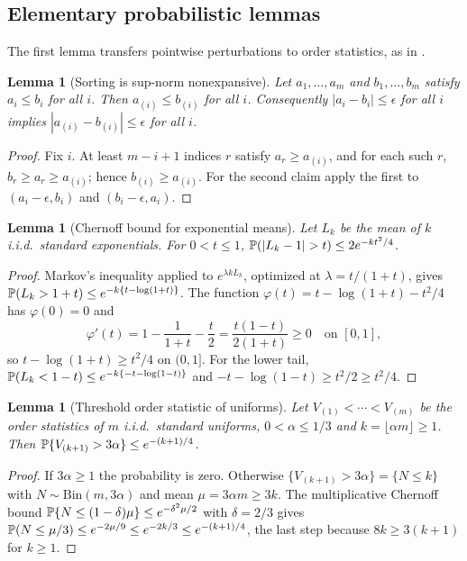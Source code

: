 \documentclass[bj,authoryear]{imsart}
\theoremstyle{plain}
\newtheorem{lemma}[theorem]{Lemma}
\begin{document}
\begin{appendix}
\subsection{Elementary probabilistic lemmas}\label{app:elementary}

The first lemma transfers pointwise perturbations to order statistics, as
in \citet[Appendix, Lemma~3]{gardesPodgorny2025}.

\begin{lemma}[Sorting is sup-norm nonexpansive]\label{lem:app-sorting}
Let $a_1,\ldots,a_m$ and $b_1,\ldots,b_m$ satisfy $a_i\le b_i$ for all $i$.
Then $a_{(i)}\le b_{(i)}$ for all $i$.  Consequently
$|a_i-b_i|\le\epsilon$ for all $i$ implies
$|a_{(i)}-b_{(i)}|\le\epsilon$ for all $i$.
\end{lemma}

\begin{proof}
Fix $i$.  At least $m-i+1$ indices $r$ satisfy $a_r\ge a_{(i)}$, and for
each such $r$, $b_r\ge a_r\ge a_{(i)}$; hence $b_{(i)}\ge a_{(i)}$.  For
the second claim apply the first to $(a_i-\epsilon,b_i)$ and
$(b_i-\epsilon,a_i)$.
\end{proof}

\begin{lemma}[Chernoff bound for exponential means]\label{lem:app-chernoff}
Let $L_k$ be the mean of $k$ i.i.d.\ standard exponentials.  For
$0<t\le1$,
$\Pp(|L_k-1|>t)\le2e^{-kt^2/4}$.
\end{lemma}

\begin{proof}
Markov's inequality applied to $e^{\lambda kL_k}$, optimized at
$\lambda=t/(1+t)$, gives
$\mathbb P(L_k>1+t)\le e^{-k\{t-\log(1+t)\}}$.  The function
$\varphi(t)=t-\log(1+t)-t^2/4$ has $\varphi(0)=0$ and
\[
 \varphi'(t)=1-\frac1{1+t}-\frac t2=\frac{t(1-t)}{2(1+t)}\ge0
 \quad\text{on }[0,1],
\]
so $t-\log(1+t)\ge t^2/4$ on $(0,1]$.  For the lower tail,
$\mathbb P(L_k<1-t)\le e^{-k\{-t-\log(1-t)\}}$ and
$-t-\log(1-t)\ge t^2/2\ge t^2/4$.
\end{proof}

\begin{lemma}[Threshold order statistic of uniforms]\label{lem:app-threshold}
Let $V_{(1)}<\cdots<V_{(m)}$ be the order statistics of $m$ i.i.d.\
standard uniforms, $0<\alpha\le1/3$ and
$k=\lfloor\alpha m\rfloor\ge1$.  Then
$\mathbb P\{V_{(k+1)}>3\alpha\}\le e^{-(k+1)/4}$.
\end{lemma}

\begin{proof}
If $3\alpha\ge1$ the probability is zero.  Otherwise
$\{V_{(k+1)}>3\alpha\}=\{N\le k\}$ with
$N\sim\mathrm{Bin}(m,3\alpha)$ and mean $\mu=3\alpha m\ge3k$.  The
multiplicative Chernoff bound
$\mathbb P\{N\le(1-\delta)\mu\}\le e^{-\delta^2\mu/2}$
\citep[Section~2.2]{boucheronLugosiMassart2013} with $\delta=2/3$ gives
$\mathbb P(N\le\mu/3)\le e^{-2\mu/9}\le e^{-2k/3}\le e^{-(k+1)/4}$, the last
step because $8k\ge3(k+1)$ for $k\ge1$.
\end{proof}


\end{appendix}
\end{document}
